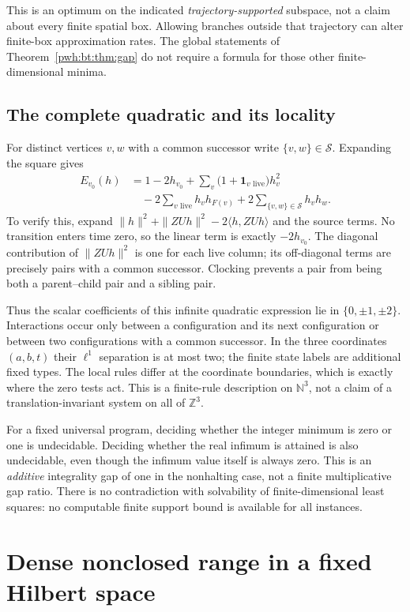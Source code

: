 \documentclass[11pt,letterpaper]{article}
\numberwithin{equation}{section}
\theoremstyle{definition}
\newcommand{\N}{\mathbb N}
\newcommand{\Z}{\mathbb Z}
\newcommand{\one}{\mathbf 1}
\begin{document}
This is an optimum on the indicated \emph{trajectory-supported}
subspace, not a claim about every finite spatial box. Allowing branches
outside that trajectory can alter finite-box approximation rates. The
global statements of Theorem~\ref{pwh:bt:thm:gap} do not require a formula for
those other finite-dimensional minima.

\subsection{The complete quadratic and its locality}
For distinct vertices $v,w$ with a common successor write
$\{v,w\}\in\mathcal S$. Expanding the square gives
\begin{align}\label{pwh:bt:eq:expanded}
 E_{v_0}(h)
 &=1-2h_{v_0}
 +\sum_v\bigl(1+\one_{v\text{ live}}\bigr)h_v^2\nonumber\\
 &\quad-2\sum_{v\text{ live}}h_vh_{F(v)}
 +2\sum_{\{v,w\}\in\mathcal S}h_vh_w.
\end{align}
To verify this, expand $\|h\|^2+\|ZU h\|^2-2\langle h,ZUh\rangle$
and the source terms. No transition enters time zero, so the linear
term is exactly $-2h_{v_0}$. The diagonal contribution of $\|ZU h\|^2$
is one for each live column; its off-diagonal terms are precisely
pairs with a common successor. Clocking prevents a pair from being both
a parent--child pair and a sibling pair.

Thus the scalar coefficients of this infinite quadratic expression lie
in $\{0,\pm1,\pm2\}$. Interactions occur only between a configuration
and its next configuration or between two configurations with a common
successor. In the three coordinates $(a,b,t)$ their $\ell^1$ separation
is at most two; the finite state labels are additional fixed types.
The local rules differ at the coordinate boundaries, which is exactly
where the zero tests act. This is a finite-rule description on
$\N^3$, not a claim of a translation-invariant system on all of $\Z^3$.

For a fixed universal program, deciding whether the integer minimum is
zero or one is undecidable. Deciding whether the real infimum is
attained is also undecidable, even though the infimum value itself is
always zero. This is an \emph{additive} integrality gap of one in the
nonhalting case, not a finite multiplicative gap ratio. There is no
contradiction with solvability of finite-dimensional least squares: no
computable finite support bound is available for all instances.

\section{Dense nonclosed range in a fixed Hilbert space}\label{pwh:bt:sec:hilbert}
\end{document}
